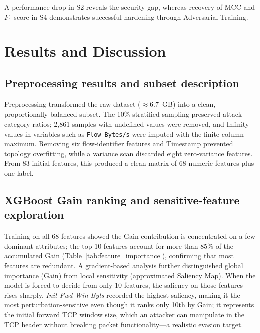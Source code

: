 \documentclass{iaesarticle}
\begin{document}
A performance drop in S2 reveals the security gap, whereas recovery of MCC and $F_1$-score in S4 demonstrates successful hardening through Adversarial Training.

\section{Results and Discussion}
\subsection{Preprocessing results and subset description}
Preprocessing transformed the raw dataset ($\approx6.7$~GB) into a clean, proportionally balanced subset. The 10\% stratified sampling preserved attack-category ratios; 2{,}861 samples with undefined values were removed, and Infinity values in variables such as \texttt{Flow Bytes/s} were imputed with the finite column maximum. Removing six flow-identifier features and Timestamp prevented topology overfitting, while a variance scan discarded eight zero-variance features. From 83 initial features, this produced a clean matrix of 68 numeric features plus one label.

\subsection{XGBoost Gain ranking and sensitive-feature exploration}
Training on all 68 features showed the Gain contribution is concentrated on a few dominant attributes; the top-10 features account for more than 85\% of the accumulated Gain (Table~\ref{tab:feature_importance}), confirming that most features are redundant. A gradient-based analysis further distinguished global importance (Gain) from local sensitivity (approximated Saliency Map). When the model is forced to decide from only 10 features, the saliency on those features rises sharply. \textit{Init Fwd Win Byts} recorded the highest saliency, making it the most perturbation-sensitive even though it ranks only 10th by Gain; it represents the initial forward TCP window size, which an attacker can manipulate in the TCP header without breaking packet functionality---a realistic evasion target.
\end{document}
